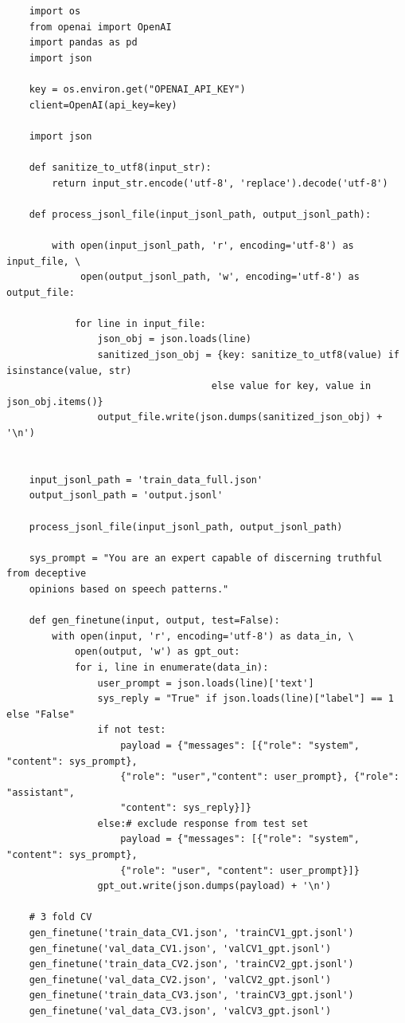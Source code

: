 \documentclass[10pt,twocolumn,letterpaper]{article}
\begin{document}
\begin{verbatim}
    import os
    from openai import OpenAI
    import pandas as pd
    import json
    
    key = os.environ.get("OPENAI_API_KEY")
    client=OpenAI(api_key=key)
    
    import json
    
    def sanitize_to_utf8(input_str):
        return input_str.encode('utf-8', 'replace').decode('utf-8')
    
    def process_jsonl_file(input_jsonl_path, output_jsonl_path):
    
        with open(input_jsonl_path, 'r', encoding='utf-8') as input_file, \
             open(output_jsonl_path, 'w', encoding='utf-8') as output_file:
    
            for line in input_file:
                json_obj = json.loads(line)
                sanitized_json_obj = {key: sanitize_to_utf8(value) if isinstance(value, str) 
                                    else value for key, value in json_obj.items()}
                output_file.write(json.dumps(sanitized_json_obj) + '\n')
    
    
    input_jsonl_path = 'train_data_full.json'
    output_jsonl_path = 'output.jsonl'
    
    process_jsonl_file(input_jsonl_path, output_jsonl_path)
    
    sys_prompt = "You are an expert capable of discerning truthful from deceptive 
    opinions based on speech patterns."
    
    def gen_finetune(input, output, test=False):
        with open(input, 'r', encoding='utf-8') as data_in, \
            open(output, 'w') as gpt_out:
            for i, line in enumerate(data_in):
                user_prompt = json.loads(line)['text']
                sys_reply = "True" if json.loads(line)["label"] == 1 else "False"
                if not test:
                    payload = {"messages": [{"role": "system", "content": sys_prompt}, 
                    {"role": "user","content": user_prompt}, {"role": "assistant", 
                    "content": sys_reply}]}
                else:# exclude response from test set
                    payload = {"messages": [{"role": "system", "content": sys_prompt}, 
                    {"role": "user", "content": user_prompt}]}
                gpt_out.write(json.dumps(payload) + '\n')
    
    # 3 fold CV
    gen_finetune('train_data_CV1.json', 'trainCV1_gpt.jsonl')
    gen_finetune('val_data_CV1.json', 'valCV1_gpt.jsonl')
    gen_finetune('train_data_CV2.json', 'trainCV2_gpt.jsonl')
    gen_finetune('val_data_CV2.json', 'valCV2_gpt.jsonl')
    gen_finetune('train_data_CV3.json', 'trainCV3_gpt.jsonl')
    gen_finetune('val_data_CV3.json', 'valCV3_gpt.jsonl')
    

\end{verbatim}
\end{document}
